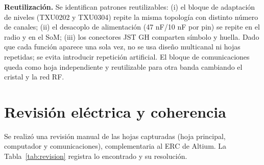 \documentclass[11pt,letterpaper]{article}
\begin{document}
\textbf{Reutilización.} Se identifican patrones reutilizables: (i) el bloque de adaptación de niveles (TXU0202 y TXU0304) repite la misma topología con distinto número de canales; (ii) el desacoplo de alimentación (47 nF/10 nF por pin) se repite en el radio y en el SoM; (iii) los conectores JST GH comparten símbolo y huella. Dado que cada función aparece una sola vez, no se usa diseño multicanal ni hojas repetidas; se evita introducir repetición artificial. El bloque de comunicaciones queda como hoja independiente y reutilizable para otra banda cambiando el cristal y la red RF.

\section{Revisión eléctrica y coherencia}
\label{sec:revision}
Se realizó una revisión manual de las hojas capturadas (hoja principal, computador y comunicaciones), complementaria al ERC de Altium. La Tabla~\ref{tab:revision} registra lo encontrado y su resolución.
\end{document}

